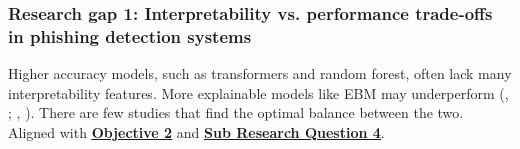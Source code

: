 
\subsubsection*{Research gap 1: Interpretability vs. performance trade-offs in phishing detection systems}\label{research-gap-1}
Higher accuracy models, such as transformers and random forest, often lack many interpretability features. More explainable models like EBM may underperform (\citeauthor{do2024integrated}, \citeyear{do2024integrated}; \citeauthor{greco2023explaining}, \citeyear{greco2023explaining}). There are few studies that find the optimal balance between the two. Aligned with \hyperref[objective-2]{\uline{\textbf{Objective 2}}} and \hyperref[sub-research-q4]{\uline{\textbf{Sub Research Question 4}}}.
